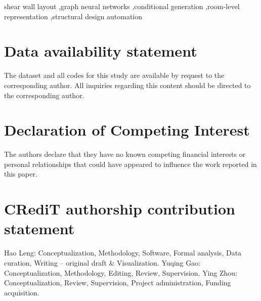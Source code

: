 \documentclass[final,5p,times,twocolumn, fleqn]{elsarticle}
\begin{document}
\begin{frontmatter}
\begin{keyword}
shear wall layout \sep graph neural networks \sep conditional generation \sep room-level representation \sep structural design automation 
\end{keyword}

\end{frontmatter}








\section*{Data availability statement}
The dataset and all codes for this study are available by request to the corresponding author. All inquiries regarding this content should be directed to the corresponding author. 

\section*{Declaration of Competing Interest}
The authors declare that they have no known competing financial interests or personal relationships that could have appeared to influence the work reported in this paper.

\section*{CRediT authorship contribution statement}
Hao Leng: Conceptualization, Methodology, Software, Formal analysis, Data curation, Writing – original draft \& Visualization. Yuqing Gao: Conceptualization, Methodology, Editing, Review, Supervision. Ying Zhou: Conceptualization, Review, Supervision, Project administration, Funding acquisition. 
\end{document}
